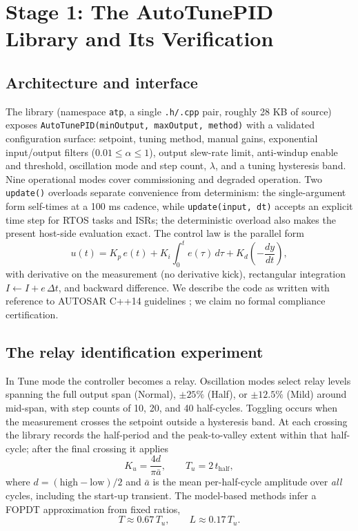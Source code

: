 \documentclass[10pt,twocolumn]{article}
\begin{document}
\section{Stage 1: The AutoTunePID Library and Its Verification}
\label{sec:library}

\subsection{Architecture and interface}

The library (namespace \texttt{atp}, a single \texttt{.h/.cpp} pair, roughly 28 KB of source) exposes \texttt{AutoTunePID(minOutput, maxOutput, method)} with a validated configuration surface: setpoint, tuning method, manual gains, exponential input/output filters ($0.01 \le \alpha \le 1$), output slew-rate limit, anti-windup enable and threshold, oscillation mode and step count, $\lambda$, and a tuning hysteresis band. Nine operational modes cover commissioning and degraded operation. Two \texttt{update()} overloads separate convenience from determinism: the single-argument form self-times at a 100 ms cadence, while \texttt{update(input, dt)} accepts an explicit time step for RTOS tasks and ISRs; the deterministic overload also makes the present host-side evaluation exact. The control law is the parallel form
\begin{equation}
u(t) = K_p\,e(t) + K_i\!\int_0^t e(\tau)\,d\tau + K_d\left(-\frac{dy}{dt}\right),
\label{eq:pid}
\end{equation}
with derivative on the measurement (no derivative kick), rectangular integration $I \leftarrow I + e\,\Delta t$, and backward difference. We describe the code as written with reference to AUTOSAR C++14 guidelines \cite{autosar}; we claim no formal compliance certification.

\subsection{The relay identification experiment}

In Tune mode the controller becomes a relay. Oscillation modes select relay levels spanning the full output span (Normal), $\pm 25\%$ (Half), or $\pm 12.5\%$ (Mild) around mid-span, with step counts of 10, 20, and 40 half-cycles. Toggling occurs when the measurement crosses the setpoint outside a hysteresis band. At each crossing the library records the half-period and the peak-to-valley extent within that half-cycle; after the final crossing it applies
\begin{equation}
K_u = \frac{4d}{\pi \bar{a}}, \qquad T_u = 2\,t_{\text{half}},
\label{eq:relay}
\end{equation}
where $d = (\text{high} - \text{low})/2$ and $\bar a$ is the mean per-half-cycle amplitude over \emph{all} cycles, including the start-up transient. The model-based methods infer a FOPDT approximation from fixed ratios,
\begin{equation}
T \approx 0.67\,T_u, \qquad L \approx 0.17\,T_u.
\label{eq:tlmap}
\end{equation}
\end{document}
